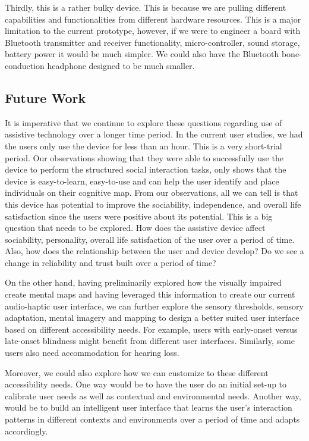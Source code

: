 Thirdly, this is a rather bulky device. This is because we are pulling different capabilities and functionalities from different hardware resources. This is a major limitation to the current prototype, however, if we were to engineer a board with Bluetooth transmitter and receiver functionality, micro-controller, sound storage, battery power it would be much simpler. We could also have the Bluetooth bone-conduction headphone designed to be much smaller. 

\subsection{Future Work}
It is imperative that we continue to explore these questions regarding use of assistive technology over a longer time period. In the current user studies, we had the users only use the device for less than an hour. This is a very short-trial period. Our observations showing that they were able to successfully use the device to perform the structured social interaction tasks, only shows that the device is easy-to-learn, easy-to-use and can help the user identify and place individuals on their cognitive map. 
From our observations, all we can tell is that this device has potential to improve the sociability, independence, and overall life satisfaction since the users were positive about its potential. This is a big question that needs to be explored. How does the assistive device affect sociability, personality, overall life satisfaction of the user over a period of time. Also, how does the relationship between the user and device develop? Do we see a change in reliability and trust built over a period of time?

On the other hand, having preliminarily explored how the visually impaired create mental maps and having leveraged this information to create our current audio-haptic user interface, we can further explore the sensory thresholds, sensory adaptation, mental imagery and mapping to design a better suited user interface based on different accessibility needs. For example, users with early-onset versus late-onset blindness might benefit from different user interfaces.  Similarly, some users also need accommodation for hearing loss.

Moreover, we could also explore how we can customize to these different accessibility needs. One way would be to have the user do an initial set-up to calibrate user needs as well as contextual and environmental needs. Another way, would be to build an intelligent user interface that learns the user's interaction patterns in different contexts and environments over a period of time and adapts accordingly.

